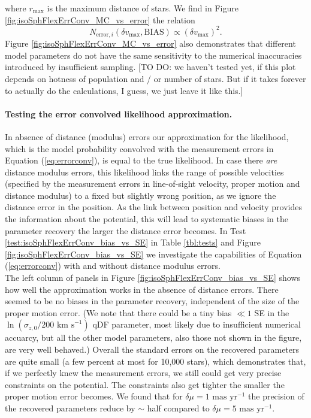 where $r_\text{max}$ is the maximum distance of stars. We find in Figure \ref{fig:isoSphFlexErrConv_MC_vs_error} the relation
\begin{equation*}
N_{\text{error},i} (\delta v_\text{max},\text{BIAS}) \propto \left( \delta v_\text{max} \right)^2.
\end{equation*}
Figure \ref{fig:isoSphFlexErrConv_MC_vs_error} also demonstrates that different model parameters do not have the same sensitivity to the numerical inaccuracies introduced by insufficient sampling. [TO DO: we haven't tested yet, if this plot depends on hotness of population and / or number of stars. But if it takes forever to actually do the calculations, I guess, we just leave it like this.]

\paragraph{Testing the error convolved likelihood approximation.} In absence of distance (modulus) errors our approximation for the likelihood, which is the model probability convolved with the measurement errors in Equation (\ref{eq:errorconv}), is equal to the true likelihood. In case there \emph{are} distance modulus errors, this likelihood links the range of possible velocities (specified by the measurement errors in line-of-sight velocity, proper motion and distance modulus) to a fixed but slightly wrong position, as we ignore the distance error in the position. As the link between position and velocity provides the information about the potential, this will lead to systematic biases in the parameter recovery the larger the distance error becomes. In Test \ref{test:isoSphFlexErrConv_bias_vs_SE} in Table \ref{tbl:tests} and Figure \ref{fig:isoSphFlexErrConv_bias_vs_SE} we investigate the capabilities of Equation (\ref{eq:errorconv}) with and without distance modulus errors.
\\The left column of panels in Figure \ref{fig:isoSphFlexErrConv_bias_vs_SE} shows how well the approximation works in the absence of distance errors. There seemed to be no biases in the parameter recovery, independent of the size of the proper motion error. (We note that there could be a tiny bias $\ll 1$ SE in the $\ln(\sigma_{z,0} / 200\text{ km s}^{-1})$ qDF parameter, most likely due to insufficient numerical accuarcy, but all the other model parameters, also those not shown in the figure, are very well behaved.) Overall the standard errors on the recovered parameters are quite small (a few percent at most for 10,000 stars), which demonstrates that, if we perfectly knew the measurement errors, we still could get very precise constraints on the potential. The constraints also get tighter the smaller the proper motion error becomes. We found that for $\delta \mu = 1 \text{ mas yr}^{-1}$ the precision of the recovered parameters reduce by $\sim$ half compared to $\delta \mu = 5 \text{ mas yr}^{-1}$.
